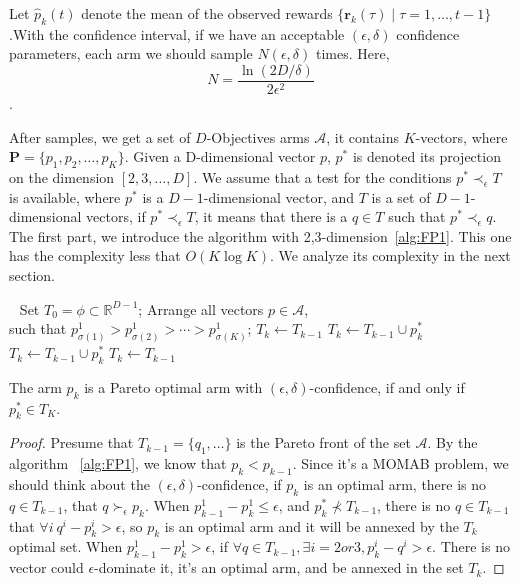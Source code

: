Let $\hat{p}_k(t)$ denote the mean of the observed rewards $\{\mathbf{r}_k(\tau)\mid \tau = 1,\dots,t-1\}$.With the confidence interval, if we have an acceptable $(\epsilon ,\delta)$ confidence parameters, each arm we should sample $N(\epsilon,\delta)$ times. Here,
\[N = \frac{\ln{(2D/\delta)}}{2\epsilon^2}\].

After samples, we get a set of $D$-Objectives arms $\mathscr{A}$, it contains $K$-vectors, where $ \mathbf{P} = \{p_1,p_2,\dots,p_K\}$. Given a D-dimensional vector $p$, $p^{\ast}$ is denoted its projection on the dimension $[2,3,\dots,D]$. We assume that a test for the conditions  $p^{\ast} \prec_{\epsilon} T$ is available, where $p^{\ast}$ is a $D-1$-dimensional vector, and $T$ is a set of $D-1$-dimensional vectors, if $p^{\ast} \prec_{\epsilon} T$, it means that there is a $q\in T$ such that $p^{\ast} \prec_{\epsilon} q$. The first part, we introduce the algorithm with 2,3-dimension~\ref{alg:FP1}. This one has the complexity less that $O(K \log{K})$. We analyze its complexity in the next section. 
\begin{algo}
\label{alg:FP1}
\begin{algorithmic}
\STATE	$\ \ $
\REQUIRE  Set $T_0 = \phi \subset \mathbb{R}^{D-1}$;
\STATE  Arrange all vectors $p\in \mathscr{A}$, \\ such that 	$p^1_{\sigma(1)}>p^1_{\sigma(2)}>\cdots>p^1_{\sigma(K)}$;
\STATE	$T_k \leftarrow T_{k-1}$
\ELSE	
\STATE	$T_k \leftarrow T_{k-1}\cup p_k^{\ast}$
\ENDIF
\ELSE
{}
\STATE	$T_k \leftarrow T_{k-1}\cup p_k^{\ast}$
\ELSE
\STATE	$T_k \leftarrow T_{k-1}$
\ENDIF
\ENDIF
\ENDFOR
\end{algorithmic}
\end{algo}
\begin{theo}
\label{theo:d23}
The arm $p_k$ is a Pareto optimal arm with $(\epsilon,\delta)$-confidence, if and only if $p_k^{\ast} \in T_K$.
\end{theo}
\begin{proof}
Presume that $T_{k-1} = \{q_1,\dots\}$ is the Pareto front of the set $\mathscr{A}$. By the algorithm ~\ref{alg:FP1}, we know that $p_k<p_{k-1}$. Since it's a MOMAB problem, we should think about the $(\epsilon,\delta)$-confidence, if $p_k$ is an optimal arm, there is no $q\in T_{k-1}$, that $q\succ_{\epsilon} p_k$. When $p_{k-1}^1-p_k^1\leqslant \epsilon$, and $p_k^{\ast}\nprec T_{k-1}$, there is no $q\in T_{k-1}$ that $\forall i\ q^i-p_k^i >\epsilon$, so $p_k$ is an optimal arm and it will be annexed by the $T_k$ optimal set. When $p_{k-1}^1-p_k^1 > \epsilon$, if $\forall q\in T_{k-1}, \exists i= 2 or 3, p_k^i-q^i>\epsilon$. There is no vector could $\epsilon$-dominate it, it's an optimal arm, and be annexed in the set $T_k$.
\end{proof}

